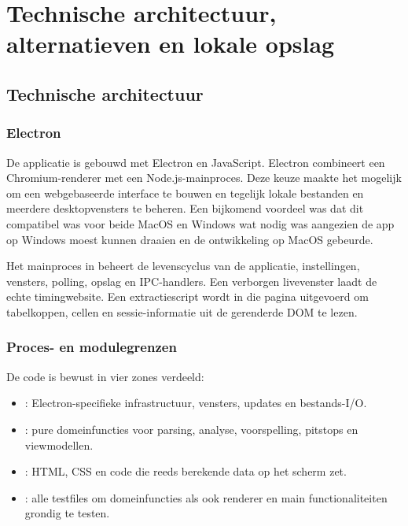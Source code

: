 
\chapter{Technische architectuur, alternatieven en lokale opslag}
\label{chap:technische-uitwerking}

\section{Technische architectuur}
\label{chap:architectuur}

\subsection{Electron}
De applicatie is gebouwd met Electron en JavaScript. Electron combineert een Chromium-renderer met
een Node.js-mainproces. Deze keuze maakte het mogelijk om een webgebaseerde interface te bouwen en
tegelijk lokale bestanden en meerdere desktopvensters te beheren. Een bijkomend voordeel was dat dit compatibel was voor beide MacOS en Windows wat nodig was aangezien de app op Windows moest kunnen draaien en de ontwikkeling op MacOS gebeurde.

Het mainproces in  beheert de levenscyclus van de applicatie, instellingen,
vensters, polling, opslag en IPC-handlers. Een verborgen livevenster laadt de echte timingwebsite.
Een extractiescript wordt in die pagina uitgevoerd om tabelkoppen, cellen en sessie-informatie uit
de gerenderde DOM te lezen.

\subsection{Proces- en modulegrenzen}
De code is bewust in vier zones verdeeld:

\begin{itemize}
  \item {}: Electron-specifieke infrastructuur, vensters, updates en bestands-I/O.
  \item {}: pure domeinfuncties voor parsing, analyse, voorspelling, pitstops en
        viewmodellen.
  \item {}: HTML, CSS en code die reeds berekende data op het scherm zet.
  \item {}: alle testfiles om domeinfuncties als ook renderer en main functionaliteiten grondig te testen.
\end{itemize}

